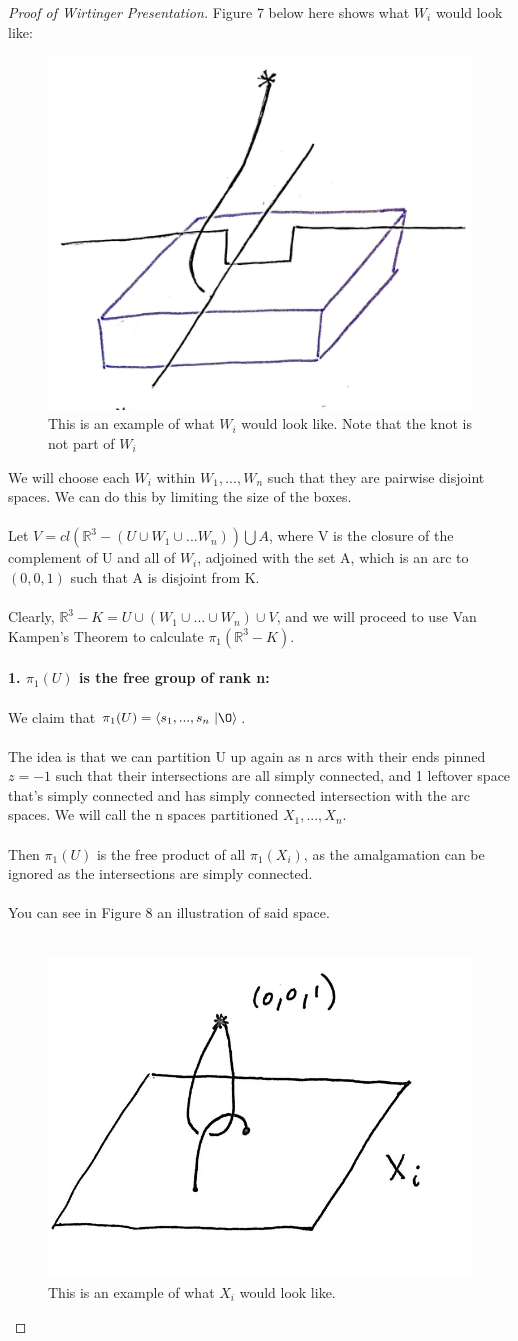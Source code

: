 \documentclass{article}
\begin{document}
\begin{proof}[Proof of Wirtinger Presentation]
Figure 7 below here shows what $W_i$ would look like:
	\begin{figure}[h!]
		\centering
		\captionsetup{width=.75\linewidth}
		\includegraphics[width=.3\linewidth]{figures/box.png}
		\caption{This is an example of what $W_i$ would look like. Note that the knot is not part of $W_i$}
		\label{fig:rtinstability}
	\end{figure}
We will choose each $W_i$ within $W_1, ..., W_n$ such that they are pairwise disjoint spaces. We can do this by limiting the size of the boxes.\\\\
Let $V = cl(\mathbb{R}^3 - (U \cup W_1 \cup ... W_n))\bigcup A$, where V is the closure of the complement of U and all of $W_i$, adjoined with the set A, which is an arc to $(0, 0, 1)$ such that A is disjoint from K.\\\\
Clearly, $\mathbb{R}^3 - K = U \cup (W_1 \cup  ... \cup W_n) \cup V$, and we will proceed to use Van Kampen's Theorem to calculate $\pi_1(\mathbb{R}^3 - K)$.\\\\
{\bf 1. $\pi_1(U)$ is the free group of rank n:}\\\\
We claim that $\pi_1(U) = \langle s_1, ..., s_n\ | \O\rangle$.\\\\
The idea is that we can partition U up again as n arcs with their ends pinned $z = -1$ such that their intersections are all simply connected, and 1 leftover space that's simply connected and has simply connected intersection with the arc spaces. We will call the n spaces partitioned $X_1, ..., X_n$.\\\\
Then $\pi_1(U)$ is the free product of all $\pi_1(X_i)$, as the amalgamation can be ignored as the intersections are simply connected.\\\\
You can see in Figure 8 an illustration of said space.\\\\
	\begin{figure}[h!]
		\centering
		\captionsetup{width=.75\linewidth}
		\includegraphics[width=.3\linewidth]{figures/knot_loop.jpg}
		\caption{This is an example of what $X_i$ would look like.}
		\label{fig:rtinstability}
	\end{figure}


\end{proof}
\end{document}
